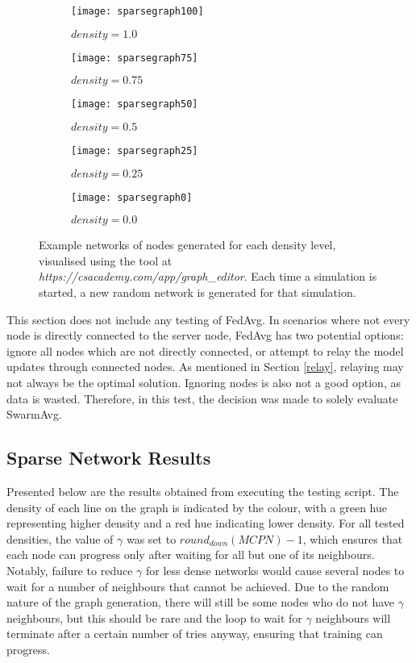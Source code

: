 \begin{figure}[H]
	\centering
	\begin{subfigure}[b]{0.3\textwidth}
		\centering
		\texttt{[image: sparsegraph100]}
		\caption{$density=1.0$}
	\end{subfigure}
	\begin{subfigure}[b]{0.3\textwidth}
		\centering
		\texttt{[image: sparsegraph75]}
		\caption{$density=0.75$}
	\end{subfigure}
	\begin{subfigure}[b]{0.3\textwidth}
		\centering
		\texttt{[image: sparsegraph50]}
		\caption{$density=0.5$}
	\end{subfigure}
	\begin{subfigure}[b]{0.3\textwidth}
		\centering
		\texttt{[image: sparsegraph25]}
		\caption{$density=0.25$}
	\end{subfigure}
	\begin{subfigure}[b]{0.3\textwidth}
		\centering
		\texttt{[image: sparsegraph0]}
		\caption{$density=0.0$}
	\end{subfigure}
	\caption{Example networks of nodes generated for each density level, visualised using the tool at \emph{https://csacademy.com/app/graph\_editor}. Each time a simulation is started, a new random network is generated for that simulation. \label{densefig}}
{}\end{figure}


This section does not include any testing of FedAvg. In scenarios where not every node is directly connected to the server node, FedAvg has two potential options: ignore all nodes which are not directly connected, or attempt to relay the model updates through connected nodes. As mentioned in Section \ref{relay}, relaying may not always be the optimal solution. Ignoring nodes is also not a good option, as data is wasted. Therefore, in this test, the decision was made to solely evaluate SwarmAvg.


\subsection{Sparse Network Results}
Presented below are the results obtained from executing the testing script. The density of each line on the graph is indicated by the colour, with a green hue representing higher density and a red hue indicating lower density. For all tested densities, the value of $\gamma$ was set to $round_{down}(MCPN) - 1$, which ensures that each node can progress only after waiting for all but one of its neighbours. Notably, failure to reduce $\gamma$ for less dense networks would cause several nodes to wait for a number of neighbours that cannot be achieved. Due to the random nature of the graph generation, there will still be some nodes who do not have $\gamma$ neighbours, but this should be rare and the loop to wait for $\gamma$ neighbours will terminate after a certain number of tries anyway, ensuring that training can progress.

